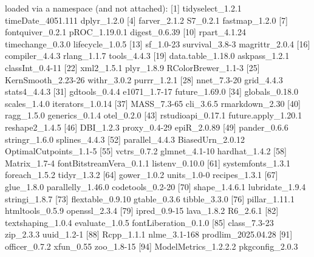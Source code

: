 \documentclass[10pt]{article}
\begin{document}
\begin{Schunk}
\begin{Soutput}
loaded via a namespace (and not attached):
 [1] tidyselect_1.2.1        timeDate_4051.111       dplyr_1.2.0            
 [4] farver_2.1.2            S7_0.2.1                fastmap_1.2.0          
 [7] fontquiver_0.2.1        pROC_1.19.0.1           digest_0.6.39          
[10] rpart_4.1.24            timechange_0.3.0        lifecycle_1.0.5        
[13] sf_1.0-23               survival_3.8-3          magrittr_2.0.4         
[16] compiler_4.4.3          rlang_1.1.7             tools_4.4.3            
[19] data.table_1.18.0       askpass_1.2.1           classInt_0.4-11        
[22] xml2_1.5.1              plyr_1.8.9              RColorBrewer_1.1-3     
[25] KernSmooth_2.23-26      withr_3.0.2             purrr_1.2.1            
[28] nnet_7.3-20             grid_4.4.3              stats4_4.4.3           
[31] gdtools_0.4.4           e1071_1.7-17            future_1.69.0          
[34] globals_0.18.0          scales_1.4.0            iterators_1.0.14       
[37] MASS_7.3-65             cli_3.6.5               rmarkdown_2.30         
[40] ragg_1.5.0              generics_0.1.4          otel_0.2.0             
[43] rstudioapi_0.17.1       future.apply_1.20.1     reshape2_1.4.5         
[46] DBI_1.2.3               proxy_0.4-29            epiR_2.0.89            
[49] pander_0.6.6            stringr_1.6.0           splines_4.4.3          
[52] parallel_4.4.3          BiasedUrn_2.0.12        OptimalCutpoints_1.1-5 
[55] vctrs_0.7.2             glmnet_4.1-10           hardhat_1.4.2          
[58] Matrix_1.7-4            fontBitstreamVera_0.1.1 listenv_0.10.0         
[61] systemfonts_1.3.1       foreach_1.5.2           tidyr_1.3.2            
[64] gower_1.0.2             units_1.0-0             recipes_1.3.1          
[67] glue_1.8.0              parallelly_1.46.0       codetools_0.2-20       
[70] shape_1.4.6.1           lubridate_1.9.4         stringi_1.8.7          
[73] flextable_0.9.10        gtable_0.3.6            tibble_3.3.0           
[76] pillar_1.11.1           htmltools_0.5.9         openssl_2.3.4          
[79] ipred_0.9-15            lava_1.8.2              R6_2.6.1               
[82] textshaping_1.0.4       evaluate_1.0.5          fontLiberation_0.1.0   
[85] class_7.3-23            zip_2.3.3               uuid_1.2-1             
[88] Rcpp_1.1.1              nlme_3.1-168            prodlim_2025.04.28     
[91] officer_0.7.2           xfun_0.55               zoo_1.8-15             
[94] ModelMetrics_1.2.2.2    pkgconfig_2.0.3        
\end{Soutput}
\end{Schunk}


\end{document}
